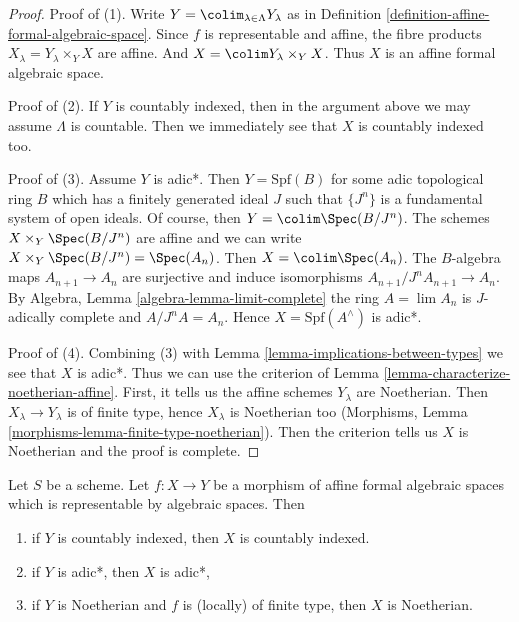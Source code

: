 \begin{proof}
Proof of (1). Write $Y = \colim_{\lambda \in \Lambda} Y_\lambda$ as in
Definition \ref{definition-affine-formal-algebraic-space}.
Since $f$ is representable and affine, the fibre products
$X_\lambda = Y_\lambda \times_Y X$ are affine. And
$X = \colim Y_\lambda \times_Y X$.
Thus $X$ is an affine formal algebraic space.

\medskip\noindent
Proof of (2). If $Y$ is countably indexed, then in the argument above
we may assume $\Lambda$ is countable.
Then we immediately see that $X$ is countably indexed too.

\medskip\noindent
Proof of (3). Assume $Y$ is adic*. Then $Y = \text{Spf}(B)$ for some adic
topological ring $B$ which has a finitely generated
ideal $J$ such that $\{J^n\}$ is a fundamental system of open ideals.
Of course, then $Y = \colim \Spec(B/J^n)$.
The schemes $X \times_Y \Spec(B/J^n)$ are affine
and we can write $X \times_Y \Spec(B/J^n) = \Spec(A_n)$.
Then $X = \colim \Spec(A_n)$. The $B$-algebra maps $A_{n + 1} \to A_n$
are surjective and induce isomorphisms $A_{n + 1}/J^nA_{n + 1} \to A_n$.
By Algebra, Lemma \ref{algebra-lemma-limit-complete} the ring
$A = \lim A_n$ is $J$-adically complete and $A/J^n A = A_n$.
Hence $X = \text{Spf}(A^\wedge)$ is adic*.

\medskip\noindent
Proof of (4). Combining (3) with Lemma \ref{lemma-implications-between-types}
we see that $X$ is adic*. Thus we can use the criterion of
Lemma \ref{lemma-characterize-noetherian-affine}.
First, it tells us the affine schemes $Y_\lambda$ are Noetherian.
Then $X_\lambda \to Y_\lambda$ is of finite type, hence $X_\lambda$
is Noetherian too (Morphisms, Lemma
\ref{morphisms-lemma-finite-type-noetherian}).
Then the criterion tells us $X$ is Noetherian and the proof is
complete.
\end{proof}

\begin{lemma}
\label{lemma-property-goes-up-affine}
Let $S$ be a scheme. Let $f : X \to Y$ be a morphism of affine formal
algebraic spaces which is representable by algebraic spaces. Then
\begin{enumerate}
\item if $Y$ is countably indexed, then $X$ is countably indexed.
\item if $Y$ is adic*, then $X$ is adic*,
\item if $Y$ is Noetherian and $f$ is (locally) of finite type, then
$X$ is Noetherian.
\end{enumerate}
\end{lemma}


